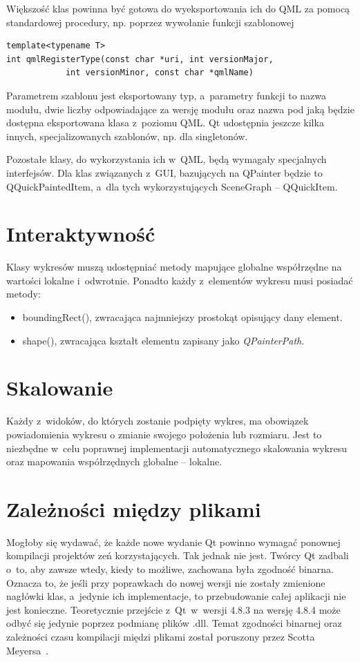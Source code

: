 Większość klas powinna być gotowa do wyeksportowania ich do QML za pomocą standardowej procedury, np. poprzez wywołanie funkcji szablonowej
\begin{lstlisting}
template<typename T>
int qmlRegisterType(const char *uri, int versionMajor, 
		    int versionMinor, const char *qmlName)
\end{lstlisting}
Parametrem szablonu jest eksportowany typ, a~parametry funkcji to nazwa modułu, dwie liczby odpowiadające za wersję modułu oraz nazwa pod jaką będzie dostępna eksportowana klasa z~poziomu QML. Qt udostępnia jeszcze kilka innych, specjalizowanych szablonów, np. dla singletonów.\newline

Pozostałe klasy, do wykorzystania ich w~QML, będą wymagały specjalnych interfejsów. Dla klas związanych z~GUI, bazujących na QPainter będzie to QQuickPaintedItem, a~dla tych wykorzystujących SceneGraph -- QQuickItem.


\section{Interaktywność}
Klasy wykresów muszą udostępniać metody mapujące globalne współrzędne na wartości lokalne i~odwrotnie. Ponadto każdy z~elementów wykresu musi posiadać metody:
\begin{itemize}
\item{boundingRect(), zwracająca najmniejszy prostokąt opisujący dany element.}
\item{shape(), zwracająca kształt elementu zapisany jako \textit{QPainterPath}.}
\end{itemize}

\section{Skalowanie}
Każdy z~widoków, do których zostanie podpięty wykres, ma obowiązek powiadomienia wykresu o zmianie swojego położenia lub rozmiaru. Jest to niezbędne w~celu poprawnej implementacji automatycznego skalowania wykresu oraz mapowania współrzędnych globalne -- lokalne.


\section{Zależności między plikami}
Mogłoby się wydawać, że każde nowe wydanie Qt powinno wymagać ponownej kompilacji projektów zeń korzystających. Tak jednak nie jest. Twórcy Qt zadbali o~to, aby zawsze wtedy, kiedy to możliwe, zachowana była zgodność binarna. Oznacza to, że jeśli przy poprawkach do nowej wersji nie zostały zmienione nagłówki klas, a~jedynie ich implementacje, to przebudowanie całej aplikacji nie jest konieczne. Teoretycznie przejście z~Qt~w~wersji 4.8.3 na wersję 4.8.4 może odbyć się jedynie poprzez podmianę plików .dll. Temat zgodności binarnej oraz zależności czasu kompilacji międzi plikami został poruszony przez Scotta Meyersa~\cite[150-158]{50Ways}.

